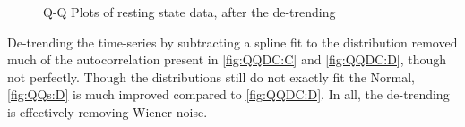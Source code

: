 \begin{figure}
\centering
{}
\caption{Q-Q Plots of resting state data, after the de-trending}
\label{fig:QQSpline}
\end{figure}

De-trending the time-series by subtracting a spline fit to the distribution
removed much of the autocorrelation present in \autoref{fig:QQDC:C} and \autoref{fig:QQDC:D},
though not perfectly. Though the distributions still do not exactly fit
the Normal, \autoref{fig:QQs:D} is much improved compared to \autoref{fig:QQDC:D}.
In all, the de-trending is effectively removing Wiener noise. 

